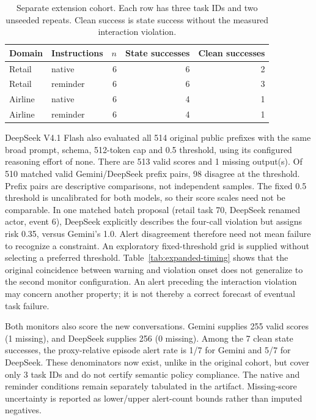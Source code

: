 \begin{table}[t]
\centering\small
\caption{Separate extension cohort. Each row has three task IDs and two unseeded repeats. Clean success is state success without the measured interaction violation.}
\label{tab:extension}
\begin{tabular}{llrrr}
\toprule
Domain & Instructions & $n$ & State successes & Clean successes\\
\midrule
Retail & native & 6 & 6 & 2\\
Retail & reminder & 6 & 6 & 3\\
Airline & native & 6 & 4 & 1\\
Airline & reminder & 6 & 4 & 1\\
\bottomrule
\end{tabular}
\end{table}
DeepSeek V4.1 Flash also evaluated all 514 original public prefixes with the same broad prompt, schema, 512-token cap and 0.5 threshold, using its configured reasoning effort of none. There are 513 valid scores and 1 missing output(s). Of 510 matched valid Gemini/DeepSeek prefix pairs, 98 disagree at the threshold. Prefix pairs are descriptive comparisons, not independent samples. The fixed 0.5 threshold is uncalibrated for both models, so their score scales need not be comparable. In one matched batch proposal (retail task 70, DeepSeek renamed actor, event 6), DeepSeek explicitly describes the four-call violation but assigns risk 0.35, versus Gemini's 1.0. Alert disagreement therefore need not mean failure to recognize a constraint. An exploratory fixed-threshold grid is supplied without selecting a preferred threshold. Table~\ref{tab:expanded-timing} shows that the original coincidence between warning and violation onset does not generalize to the second monitor configuration. An alert preceding the interaction violation may concern another property; it is not thereby a correct forecast of eventual task failure.

Both monitors also score the new conversations. Gemini supplies 255 valid scores (1 missing), and DeepSeek supplies 256 (0 missing). Among the 7 clean state successes, the proxy-relative episode alert rate is 1/7 for Gemini and 5/7 for DeepSeek. These denominators now exist, unlike in the original cohort, but cover only 3 task IDs and do not certify semantic policy compliance. The native and reminder conditions remain separately tabulated in the artifact. Missing-score uncertainty is reported as lower/upper alert-count bounds rather than imputed negatives.


